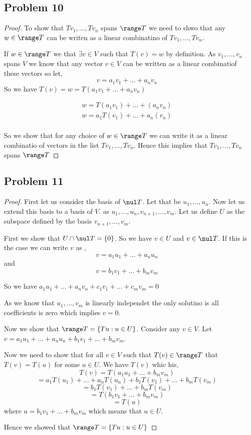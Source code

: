 \documentclass[a4paper]{report}
\begin{document}
\subsection*{Problem 10}
\begin{proof}
    To show that $Tv_1, \dots, Tv_n$ spans $\range T$ we need to shwo that any $w \in \range T$ can be writen as a linear combinatino of $Tv_1,\dots, Tv_n$.

    If $w \in \range T$ we that $\exists v\in V$ such that $T(v) = w$ by definition. As $v_1,\dots,v_n$ spans $V$ we know that any vector $v \in V$ can be written as a linear combinatiof these vectors so let, 
    $$ v = a_1v_1 + \dots + a_nv_n $$
    So we have $T(v) = w = T(a_1v_1 + \dots + a_nv_n)$

    \begin{align*}
        w = T(a_1v_1) + \dots + (a_nv_n)\\
        w = a_1T(v_1) + \dots + a_n(v_n)\\
    \end{align*}

    So we show that for any choice of $w \in \range T$ we can write it as a linear combinatio of vectors in the list $Tv_1,\dots,Tv_n$. Hence this implies that $Tv_1, \dots, Tv_n$ spans $\range T$
\end{proof}

\subsection*{Problem 11}
\begin{proof}
    First let us consider the basis of $\nul T$. Let that be  $u_1,\dots,u_n$. Now let us extend this basis to a basis of $V$. as $u_1,\dots,u_n, v_{n+1},\dots,v_m$. Let us define $U$ as the subspace defined by the basis $v_{n+1},\dots,v_m$.

    First we show that $U \cap \nul T = \{0\}$. So we have $v \in U$ and $v \in \nul T$. If this is the case we can write  $v $ as , 
    $$ v = a_1u_1 + \dots + a_nu_n $$  and 
    $$ v = b_1v_1 + \dots + b_mv_m $$ 

    So we have $a_1u_1 + \dots + a_nv_n + c_1v_1 + \dots + c_mv_m = 0$

    As we know that $u_1,\dots,v_m$ is linearly independet the only solutino is all coefficients is zero which implies $v = 0$.

    Now we show that  $\range T = \{Tu : u \in U\}$. Consider any  $v \in V$. Let $v = a_1u_1 + \dots + a_nu_n + b_1v_1 + \dots + b_mv_m$.

    Now we need to show that  for all $v \in V$ such that $T(v) \in \range T$ that $T(v) = T(u)$ for some $u \in U$. We have $T(v)$ whic his, 
    $$ T(v) =  T(a_1u_1 + \dots + b_mv_m) $$ 
    $$ = a_1T(u_1) + \dots +a_nT(u_n) + b_1T(v_1) + \dots + b_mT(v_m) $$ 
    $$ = b_1T(v_1) + \dots + b_mT(v_m) $$ 
    $$ = T(b_1v_1 + \dots + b_mv_m) $$ 
    $$ = T(u) $$ where $ u = b_1v_1 + \dots + b_mv_m$ which means that $ u \in U$.

    Hence we showed that  $\range T = \{Tu : u \in U\}$
\end{proof}
\end{document}
